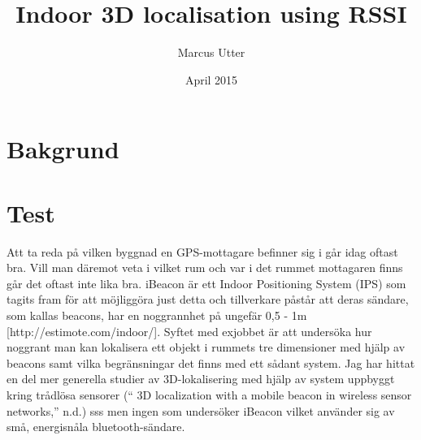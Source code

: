 \documentclass{article}
\title{Indoor 3D localisation using RSSI}
\author{Marcus Utter }
\date{April 2015}
\begin{document}
\maketitle

\section{Bakgrund}

\section{Test}
Att ta reda på vilken byggnad en GPS-mottagare befinner sig i går idag oftast bra. Vill man däremot veta i vilket rum och var i det rummet mottagaren finns går det oftast inte lika bra. iBeacon är ett Indoor Positioning System (IPS) som tagits fram för att möjliggöra just detta och tillverkare påstår att deras sändare, som kallas beacons, har en noggrannhet på ungefär 0,5 - 1m [http://estimote.com/indoor/]. 
Syftet med exjobbet är att undersöka hur noggrant man kan lokalisera ett objekt i rummets tre dimensioner med hjälp av beacons samt vilka begränsningar det finns med ett sådant system. Jag har hittat en del mer generella studier av 3D-lokalisering med hjälp av system uppbyggt kring trådlösa sensorer (“ 3D localization with a mobile beacon in wireless sensor networks,” n.d.)  sss  men ingen som undersöker iBeacon vilket använder sig av små, energisnåla bluetooth-sändare.
\end{document}
